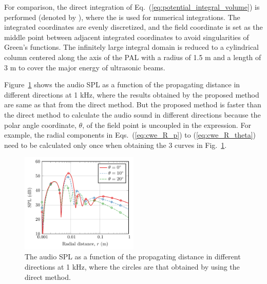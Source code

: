 For comparison, the direct integration of Eq.~(\ref{eq:potential_integral_volume}) is performed (denoted by ), where the  is used for numerical integrations. 
The integrated coordinates are evenly discretized, and the field coordinate is set as the middle point between adjacent integrated coordinates to avoid singularities of Green's functions. 
The infinitely large integral domain is reduced to a cylindrical column centered along the axis of the PAL with a radius of 1.5 m and a length of 3 m to cover the major energy of ultrasonic beams. 

Figure~\ref{fig:verification:f2w90fs} shows the audio SPL as a function of the propagating distance in different directions at 1 kHz, where the results obtained by the proposed method are same as that from the direct method. 
But the proposed method is faster than the direct method to calculate the audio sound in different directions because the polar angle coordinate, $\theta$, of the field point is uncoupled in the expression. 
For example, the radial components in Eqs.~(\ref{eq:cwe_R_p}) to (\ref{eq:cwe_R_theta}) need to be calculated only once when obtaining the 3 curves in Fig.~\ref{fig:verification:f2w90fs}.

\begin{figure}[h]
    \centering
    \includegraphics[width = 0.5\textwidth]{Figures/pending/compare_Cervenka2019JASA_diffAngle_200802F.pdf}
    \caption{The audio SPL  as a function of the propagating distance in different directions at 1 kHz, where the circles are that obtained by using the direct method. 
    }
    \label{fig:verification:f2w90fs}
\end{figure}


